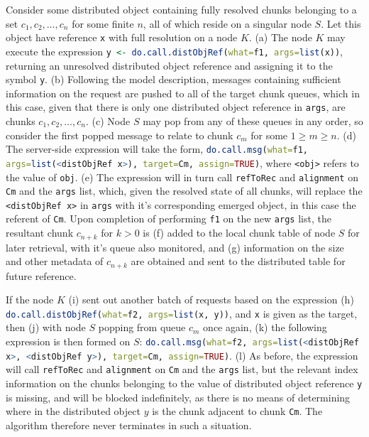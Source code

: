 \documentclass[a4paper,10pt]{article}
\begin{document}
Consider some distributed object containing fully resolved chunks belonging to
a set \({c_1, c_2, \dots, c_n}\) for some finite \(n\), all of which reside on
a singular node \(S\).
Let this object have reference \texttt{x} with full resolution on a node \(K\).
(\textcolor{dark2-1}{a}) The node \(K\) may execute the expression 
\lstinline[language=R]{y <- do.call.distObjRef(what=f1, args=list(x))}, returning an
unresolved distributed object reference and assigning it to the symbol
\texttt{y}.
(\textcolor{dark2-1}{b}) Following the model description, messages containing sufficient information on
the request are pushed to all of the target chunk queues, which in this case,
given that there is only one distributed object reference in \texttt{args}, are
chunks \(c_1, c_2, \dots, c_n\).
(\textcolor{dark2-1}{c}) Node \(S\) may pop from any of these queues in any order, so consider the first
popped message to relate to chunk \(c_m\) for some \(1 \geq m \geq n\).
(\textcolor{dark2-1}{d}) The server-side expression will take the form, 
\lstinline[language=R]{do.call.msg(what=f1, args=list(<distObjRef x>), target=Cm, assign=TRUE)},
where \texttt{<obj>} refers to the value of \texttt{obj}.
(\textcolor{dark2-1}{e}) The expression will in turn call \lstinline[language=R]{refToRec} and
\lstinline[language=R]{alignment} on \texttt{Cm} and the \texttt{args} list,
which, given the resolved state of all chunks, will replace the
\texttt{<distObjRef x>} in \texttt{args} with it's corresponding emerged
object, in this case the referent of \texttt{Cm}.
Upon completion of performing \texttt{f1} on the new \texttt{args} list, the
resultant chunk \(c_{n+k}\) for \(k > 0 \) is (\textcolor{dark2-1}{f}) added to the local chunk table
of node \(S\) for later retrieval, with it's queue also monitored, and (\textcolor{dark2-1}{g})
information on the size and other metadata of \(c_{n+k}\) are obtained and sent
to the distributed table for future reference.

 If the node \(K\) (\textcolor{dark2-2}{i}) sent out another batch of requests
 based on the expression (\textcolor{dark2-2}{h})
\lstinline[language=R]{do.call.distObjRef(what=f2, args=list(x, y))}, and
\texttt{x} is given as the target, then (\textcolor{dark2-2}{j}) with node \(S\) popping from queue
\(c_m\) once again, (\textcolor{dark2-2}{k}) the following expression is then formed on \(S\):
\lstinline[language=R]{do.call.msg(what=f2, args=list(<distObjRef x>, <distObjRef y>), target=Cm, assign=TRUE)}.
(\textcolor{dark2-2}{l}) As before, the expression will call \lstinline[language=R]{refToRec} and
\lstinline[language=R]{alignment} on \texttt{Cm} and the \texttt{args} list,
but the relevant index information on the chunks belonging to the value of
distributed object reference \texttt{y} is missing, and will be blocked
indefinitely, as there is no means of determining where in the distributed
object \(y\) is the chunk adjacent to chunk \texttt{Cm}.
The algorithm therefore never terminates in such a situation.
\end{document}
